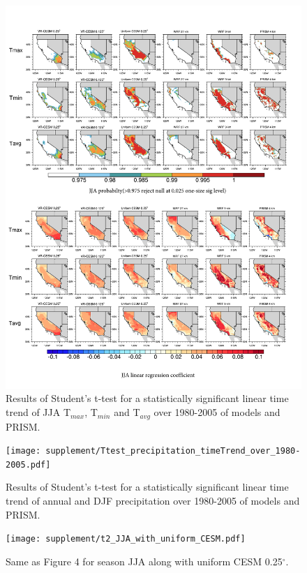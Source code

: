 \begin{figure}
\begin{center}
\includegraphics[width=6in]{supplement/Ttest_JJAT2_timeTrend_over_1980-2005.pdf}
\caption{Results of Student's t-test for a statistically significant linear time trend of JJA T$_{max}$, T$_{min}$ and T$_{avg}$ over 1980-2005 of models and PRISM.}
\end{center}
\end{figure}
%
\begin{figure}
\begin{center}
\texttt{[image: supplement/Ttest\_precipitation\_timeTrend\_over\_1980-2005.pdf]}
\caption{Results of Student's t-test for a statistically significant linear time trend of annual and DJF precipitation over 1980-2005 of models and PRISM.}
\end{center}
\end{figure}

\begin{figure}
\begin{center}
\texttt{[image: supplement/t2\_JJA\_with\_uniform\_CESM.pdf]}
\caption{Same as Figure 4 for season JJA along with uniform CESM 0.25$^\circ$.}
\end{center}
\end{figure}

